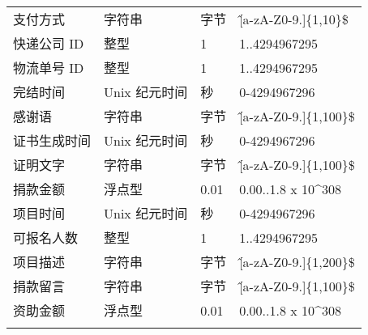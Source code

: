 \begin{longtable}{p{3.5cm}llp{4cm}}
        支付方式 & 字符串 & 字节 & \^[a-zA-Z0-9.]\{1,10\}\$ \\ 
        快递公司 ID & 整型  & 1 & 1..4294967295 \\ 
        物流单号 ID & 整型  & 1 & 1..4294967295 \\ 
        完结时间 & Unix 纪元时间 & 秒 & 0-4294967296 \\ 
        感谢语 & 字符串 & 字节 & \^[a-zA-Z0-9.]\{1,100\}\$ \\ 
        证书生成时间 & Unix 纪元时间 & 秒 & 0-4294967296 \\ 
        证明文字 & 字符串 & 字节 & \^[a-zA-Z0-9.]\{1,100\}\$ \\ 
        捐款金额 & 浮点型  & 0.01 & 0.00..1.8 x 10^308 \\ 
        项目时间 & Unix 纪元时间 & 秒 & 0-4294967296 \\
        可报名人数 & 整型  & 1 & 1..4294967295 \\ 
        项目描述 & 字符串 & 字节 & \^[a-zA-Z0-9.]\{1,200\}\$ \\ 
        捐款留言 & 字符串 & 字节 & \^[a-zA-Z0-9.]\{1,100\}\$ \\ 
        资助金额 & 浮点型  & 0.01 & 0.00..1.8 x 10^308 \\ 
        \label{item_description}
\end{longtable}